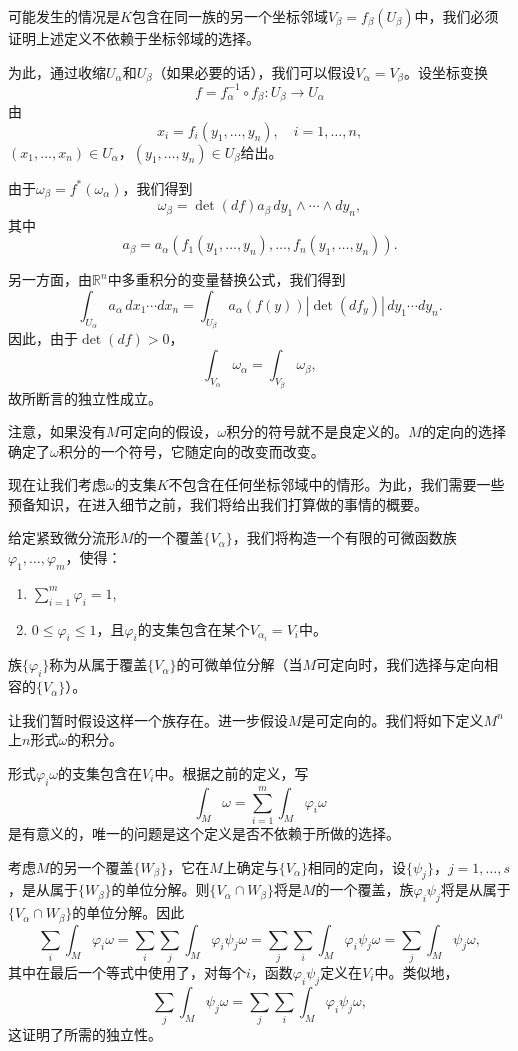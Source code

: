\documentclass[12pt,a4paper]{ctexbook}
\begin{document}
可能发生的情况是$K$包含在同一族的另一个坐标邻域$V_\beta = f_\beta(U_\beta)$中，我们必须证明上述定义不依赖于坐标邻域的选择。

为此，通过收缩$U_\alpha$和$U_\beta$（如果必要的话），我们可以假设$V_\alpha = V_\beta$。设坐标变换
$$f = f_\alpha^{-1}\circ f_\beta: U_\beta\to U_\alpha$$
由
$$x_i = f_i(y_1,\ldots,y_n),\quad i=1,\ldots,n,$$
$(x_1,\ldots,x_n)\in U_\alpha$，$(y_1,\ldots,y_n)\in U_\beta$给出。

由于$\omega_\beta = f^*(\omega_\alpha)$，我们得到
$$\omega_\beta = \det(df)a_\beta\,dy_1\wedge\cdots\wedge dy_n,$$
其中
$$a_\beta = a_\alpha(f_1(y_1,\ldots,y_n),\ldots,f_n(y_1,\ldots,y_n)).$$

另一方面，由$\mathbb{R}^n$中多重积分的变量替换公式，我们得到
$$\int_{U_\alpha} a_\alpha\,dx_1\cdots dx_n = \int_{U_\beta} a_\alpha(f(y))|\det(df_y)|\,dy_1\cdots dy_n.$$
因此，由于$\det(df)>0$，
$$\int_{V_\alpha} \omega_\alpha = \int_{V_\beta} \omega_\beta,$$
故所断言的独立性成立。

注意，如果没有$M$可定向的假设，$\omega$积分的符号就不是良定义的。$M$的定向的选择确定了$\omega$积分的一个符号，它随定向的改变而改变。

现在让我们考虑$\omega$的支集$K$不包含在任何坐标邻域中的情形。为此，我们需要一些预备知识，在进入细节之前，我们将给出我们打算做的事情的概要。

给定紧致微分流形$M$的一个覆盖$\{V_\alpha\}$，我们将构造一个有限的可微函数族$\varphi_1,\ldots,\varphi_m$，使得：
\begin{enumerate}[label=\alph*)]
    \item $\sum_{i=1}^m \varphi_i = 1$,
    \item $0\leq \varphi_i\leq 1$，且$\varphi_i$的支集包含在某个$V_{\alpha_i}=V_i$中。
\end{enumerate}

族$\{\varphi_i\}$称为从属于覆盖$\{V_\alpha\}$的可微单位分解（当$M$可定向时，我们选择与定向相容的$\{V_\alpha\}$）。

让我们暂时假设这样一个族存在。进一步假设$M$是可定向的。我们将如下定义$M^n$上$n$形式$\omega$的积分。

形式$\varphi_i\omega$的支集包含在$V_i$中。根据之前的定义，写
$$\int_M \omega = \sum_{i=1}^m \int_M \varphi_i\omega$$
是有意义的，唯一的问题是这个定义是否不依赖于所做的选择。

考虑$M$的另一个覆盖$\{W_\beta\}$，它在$M$上确定与$\{V_\alpha\}$相同的定向，设$\{\psi_j\}$，$j=1,\ldots,s$，是从属于$\{W_\beta\}$的单位分解。则$\{V_\alpha\cap W_\beta\}$将是$M$的一个覆盖，族$\varphi_i\psi_j$将是从属于$\{V_\alpha\cap W_\beta\}$的单位分解。因此
$$\sum_i \int_M \varphi_i\omega = \sum_i \sum_j \int_M \varphi_i\psi_j\omega = \sum_j \sum_i \int_M \varphi_i\psi_j\omega = \sum_j \int_M \psi_j\omega,$$
其中在最后一个等式中使用了，对每个$i$，函数$\varphi_i\psi_j$定义在$V_i$中。类似地，
$$\sum_j \int_M \psi_j\omega = \sum_j \sum_i \int_M \varphi_i\psi_j\omega,$$
这证明了所需的独立性。
\end{document}
